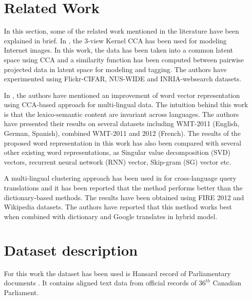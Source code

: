 \documentclass{article} %
\begin{document}


\section{Related Work}
\label{related_work}
In this section, some of the related work mentioned in the literature have been explained in brief. In \cite{Gong2013}, the 3-view Kernel CCA has been used for modeling Internet images. In this work, the data has been taken into a common latent space using CCA and a similarity function has been computed between pairwise projected data in latent space for modeling and tagging. The authors have experimented using Flickr-CIFAR, NUS-WIDE and INRIA-websearch datasets.

In \cite{Faruqui2014}, the authors have mentioned an improvement of word vector representation using CCA-based approach for multi-lingual data. The intuition behind this work is that the lexico-semantic content are invariant across languages. The authors have presented their results on several datasets including WMT-2011 (English, German, Spanish), combined WMT-2011 and 2012 (French). The results of the proposed word representation in this work has also been compared with several other existing word representations, as Singular value decomposition (SVD) vectors, recurrent neural network (RNN) vector, Skip-gram (SG) vector etc.

A multi-lingual clustering approach has been used in \cite{Bhattacharya2016} for cross-language query translations and it has been reported that the method performs better than the dictionary-based methods. The results have been obtained using FIRE 2012 and Wikipedia datasets. The authors have reported that this method works best when combined with dictionary and Google translates in hybrid model.


\section{Dataset description}
\label{dataset}
For this work the dataset has been used is Hansard record of Parliamentary documents \cite{datalink}. It contains aligned text data from official records of $36^{th}$ Canadian Parliament. 
\end{document}
